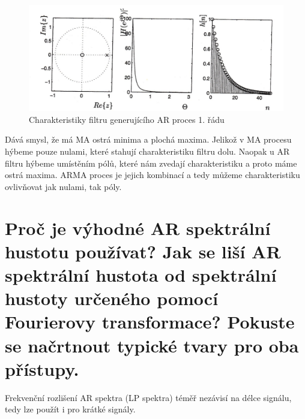\documentclass[a4paper,12pt]{article}   %
\begin{document}
\begin{figure}[h!]
        \centering
        \includegraphics[width=.6\textwidth]{fig/AR_filter.png}
        \caption*{Charakteristiky filtru generujícího AR proces 1. řádu}
        \label{fig:AR:filter}
\end{figure}
\FloatBarrier

Dává smysl, že má MA ostrá minima a plochá maxima. Jelikož v MA procesu hýbeme pouze nulami, které stahují charakteristiku filtru dolu. Naopak u AR filtru hýbeme umístěním pólů, které nám zvedají charakteristiku a proto máme ostrá maxima. ARMA proces je jejich kombinací a tedy můžeme charakteristiku ovlivňovat jak nulami, tak póly. 


\section{Proč je výhodné AR spektrální hustotu používat? Jak se liší AR spektrální hustota od spektrální hustoty určeného pomocí Fourierovy transformace? Pokuste se načrtnout typické tvary pro oba přístupy.}
Frekvenční rozlišení AR spektra (LP spektra) téměř nezávisí na délce signálu, tedy lze použít i pro krátké signály. 
\end{document}
